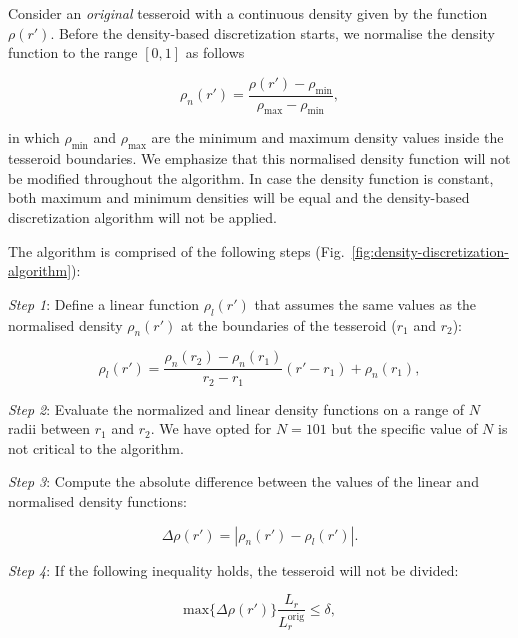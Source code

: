 \documentclass[extra, referee]{gji}
\begin{document}
Consider an \emph{original} tesseroid with a continuous density given by the function
$\rho(r')$.
Before the density-based discretization starts,
we normalise the density function to the range $[0, 1]$ as follows

\begin{equation}
    \rho_n(r') =
    \frac{\rho(r') - \rho_\text{min}}{\rho_\text{max} - \rho_\text{min}},
\end{equation}

\noindent in which $\rho_\text{min}$ and $\rho_\text{max}$ are the minimum and maximum
density values inside the tesseroid boundaries.
We emphasize that this normalised density function will not be modified throughout the
algorithm.
In case the density function is constant, both maximum and minimum densities will be
equal and the density-based discretization algorithm will not be applied.

The algorithm is comprised of the following steps
(Fig.~\ref{fig:density-discretization-algorithm}):

\textit{Step 1}:
Define a linear function $\rho_l(r')$ that assumes
the same values as the normalised density $\rho_n(r')$ at the boundaries of the
tesseroid ($r_1$ and $r_2$):

\begin{equation}
    \rho_l(r') =
    \frac{ \rho_n(r_2) - \rho_n(r_1) }{ r_2 - r_1 } (r' - r_1) + \rho_n(r_1),
    \label{eq:density-reference-line}
\end{equation}

\textit{Step 2}:
Evaluate the normalized and linear density functions on a range of $N$ radii between
$r_1$ and $r_2$.
We have opted for $N = 101$ but the specific value of $N$ is not critical to the
algorithm.

\textit{Step 3}:
Compute the absolute difference between the values of the linear and normalised density
functions:

\begin{equation}
    \Delta \rho (r') = | \rho_n(r') - \rho_l(r') |.
    \label{eq:density-abs-diff}
\end{equation}

\textit{Step 4}:
If the following inequality holds, the tesseroid will not be divided:

\begin{equation}
    \text{max}\{ \Delta \rho(r') \} \frac{L_r}{L_r^\text{orig}} \le \delta,
    \label{eq:delta-density}
\end{equation}
\end{document}
